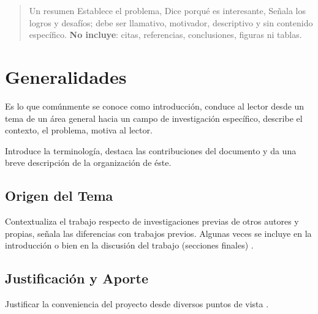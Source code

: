 \documentclass[a0,portrait]{a0poster}
\begin{document}


\begin{multicols}{3} %

\begin{abstract}
Un resumen Establece el problema, Dice porqué es interesante, Señala los logros y desafíos; debe ser llamativo, motivador, descriptivo y sin contenido específico. \textbf{No incluye}: citas, referencias, conclusiones, figuras ni tablas.
\end{abstract}


\color{negro}
\section*{Generalidades}

Es lo que comúnmente se conoce como introducción, conduce al lector desde un tema de un área general hacia un campo de investigación específico, describe el contexto, el problema, motiva al lector.

Introduce la terminología, destaca las contribuciones del documento y da una breve descripción de la organización de éste.




\subsection*{Origen del Tema}
Contextualiza el trabajo respecto de investigaciones previas de otros autores y propias, señala las diferencias con trabajos previos. Algunas veces se incluye en la introducción o bien en la discusión del trabajo (secciones finales) \cite{000}.

\subsection*{Justificación y Aporte}
Justificar la conveniencia del proyecto desde diversos puntos de vista \cite{003}.


\end{multicols}
\end{document}
